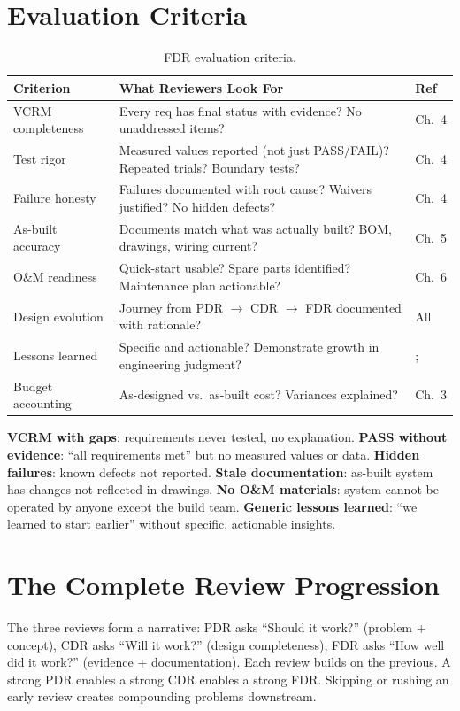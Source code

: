\documentclass[11pt,letterpaper,twoside,openany]{book}
\begin{document}
\section{Evaluation Criteria}

\begin{table}[htbp]\centering\small
\begin{tabularx}{\textwidth}{l X l}
\toprule
\textbf{Criterion} & \textbf{What Reviewers Look For} & \textbf{Ref} \\
\midrule
VCRM completeness & Every req has final status with evidence? No unaddressed items? & Ch.~4 \\
Test rigor & Measured values reported (not just PASS/FAIL)? Repeated trials? Boundary tests? & Ch.~4 \\
Failure honesty & Failures documented with root cause? Waivers justified? No hidden defects? & Ch.~4 \\
As-built accuracy & Documents match what was actually built? BOM, drawings, wiring current? & Ch.~5 \\
O\&M readiness & Quick-start usable? Spare parts identified? Maintenance plan actionable? & Ch.~6 \\
Design evolution & Journey from PDR $\to$ CDR $\to$ FDR documented with rationale? & All \\
Lessons learned & Specific and actionable? Demonstrate growth in engineering judgment? &; \\
Budget accounting & As-designed vs.\ as-built cost? Variances explained? & Ch.~3 \\
\bottomrule
\end{tabularx}
\caption{FDR evaluation criteria.}
\end{table}

\begin{tipbox}
\textbf{VCRM with gaps}: requirements never tested, no explanation. \textbf{PASS without evidence}: ``all requirements met'' but no measured values or data. \textbf{Hidden failures}: known defects not reported. \textbf{Stale documentation}: as-built system has changes not reflected in drawings. \textbf{No O\&M materials}: system cannot be operated by anyone except the build team. \textbf{Generic lessons learned}: ``we learned to start earlier'' without specific, actionable insights.
\end{tipbox}

\section{The Complete Review Progression}
The three reviews form a narrative: PDR asks ``Should it work?'' (problem + concept), CDR asks ``Will it work?'' (design completeness), FDR asks ``How well did it work?'' (evidence + documentation). Each review builds on the previous. A strong PDR enables a strong CDR enables a strong FDR. Skipping or rushing an early review creates compounding problems downstream.
\end{document}

